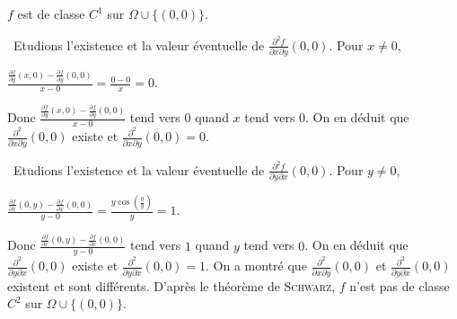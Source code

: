 {{\begin{center}
$f$ est de classe $C^1$ sur $\Omega\cup\{(0,0)\}$.
\end{center}

\textbullet~Etudions l'existence et la valeur éventuelle de $ \frac{\partial^2f}{\partial x\partial y}(0,0)$. Pour $x\neq0$,

\begin{center} 
$ \frac{ \frac{\partial f}{\partial y}(x,0)- \frac{\partial f}{\partial y}(0,0)}{x-0}= \frac{0-0}{x}=0$.
\end{center}

Donc $ \frac{ \frac{\partial f}{\partial y}(x,0)- \frac{\partial f}{\partial y}(0,0)}{x-0}$ tend vers $0$ quand $x$ tend vers $0$. On en déduit que $ \frac{\partial^2}{\partial x\partial y}(0,0)$ existe et $ \frac{\partial^2}{\partial x\partial y}(0,0)=0$. 

\textbullet~Etudions l'existence et la valeur éventuelle de $ \frac{\partial^2f}{\partial y\partial x}(0,0)$. Pour $y\neq0$,

\begin{center} 
$ \frac{ \frac{\partial f}{\partial x}(0,y)- \frac{\partial f}{\partial x}(0,0)}{y-0}= \frac{y\cos\left( \frac{0}{y}\right)}{y}=1$.
\end{center}

Donc $ \frac{ \frac{\partial f}{\partial x}(0,y)- \frac{\partial f}{\partial x}(0,0)}{y-0}$ tend vers $1$ quand $y$ tend vers $0$. On en déduit que $ \frac{\partial^2}{\partial y\partial x}(0,0)$ existe et $ \frac{\partial^2}{\partial y\partial x}(0,0)=1$. On a montré que $ \frac{\partial^2}{\partial x\partial y}(0,0)$ et $ \frac{\partial^2}{\partial y\partial x}(0,0)$ existent et sont différents. D'après le théorème de \textsc{Schwarz}, $f$ n'est pas de classe $C^2$ sur $\Omega\cup\{(0,0)\}$.
}
}
